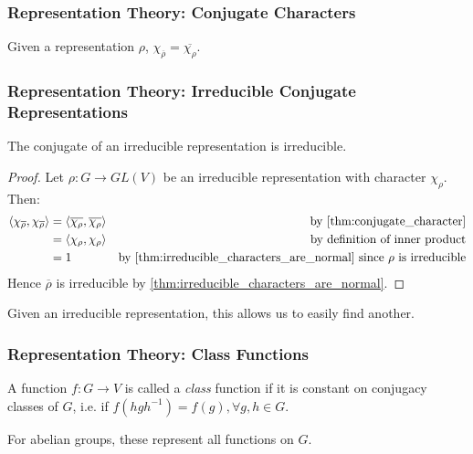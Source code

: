 \documentclass{beamer}
\newcommand{\inner}[2]{\left\langle #1, #2 \right\rangle}
\newcommand{\conj}[1]{\overline{#1}}
\begin{document}
\begin{frame}
\frametitle{Representation Theory: Conjugate Characters}
        \begin{theorem}\label{thm:conjugate_character}
            Given a representation $\rho$, $\chi_{\conj{\rho}} = \conj{\chi_\rho}$.
        \end{theorem}
\end{frame}

\begin{frame}
\frametitle{Representation Theory: Irreducible Conjugate Representations}
        \begin{theorem}\label{thm:irreducible_conjugate}
            The conjugate of an irreducible representation is irreducible.
        \end{theorem}
        \begin{proof}
            Let $\rho : G \to GL(V)$ be an irreducible representation with character $\chi_\rho$.\\
            Then:
            \begin{align*}
            \inner{\chi_{\conj{\rho}}}{\chi_{\conj{\rho}}} &= \inner{\conj{\chi_\rho}}{\conj{\chi_\rho}} & \text{by \ref{thm:conjugate_character}}\\
            &= \inner{\chi_\rho}{\chi_\rho} & \text{by definition of inner product}\\
            &= 1 & \text{by \ref{thm:irreducible_characters_are_normal} since $\rho$ is irreducible}
            \end{align*}
            Hence $\conj{\rho}$ is irreducible by \ref{thm:irreducible_characters_are_normal}.
        \end{proof}
        Given an irreducible representation, this allows us to easily find another.
\end{frame}

\begin{frame}
\frametitle{Representation Theory: Class Functions}
        \begin{definition}\label{def:class_function}
            A function $f : G \to V$ is called a \textit{class} function if it is constant on conjugacy classes of $G$, i.e. if $f(hgh^{-1}) = f(g), \forall g, h \in G$.
        \end{definition}
        For abelian groups, these represent all functions on $G$.
\end{frame}
\end{document}
